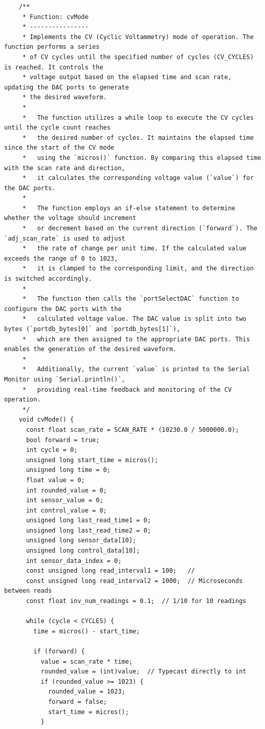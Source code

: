 \documentclass{article}
\begin{document}
\begin{lstlisting}
    /**
     * Function: cvMode
     * ----------------
     * Implements the CV (Cyclic Voltammetry) mode of operation. The function performs a series
     * of CV cycles until the specified number of cycles (CV_CYCLES) is reached. It controls the
     * voltage output based on the elapsed time and scan rate, updating the DAC ports to generate
     * the desired waveform.
     *
     *   The function utilizes a while loop to execute the CV cycles until the cycle count reaches
     *   the desired number of cycles. It maintains the elapsed time since the start of the CV mode
     *   using the `micros()` function. By comparing this elapsed time with the scan rate and direction,
     *   it calculates the corresponding voltage value (`value`) for the DAC ports.
     *
     *   The function employs an if-else statement to determine whether the voltage should increment
     *   or decrement based on the current direction (`forward`). The `adj_scan_rate` is used to adjust
     *   the rate of change per unit time. If the calculated value exceeds the range of 0 to 1023,
     *   it is clamped to the corresponding limit, and the direction is switched accordingly.
     *
     *   The function then calls the `portSelectDAC` function to configure the DAC ports with the
     *   calculated voltage value. The DAC value is split into two bytes (`portdb_bytes[0]` and `portdb_bytes[1]`),
     *   which are then assigned to the appropriate DAC ports. This enables the generation of the desired waveform.
     *
     *   Additionally, the current `value` is printed to the Serial Monitor using `Serial.println()`,
     *   providing real-time feedback and monitoring of the CV operation.
     */
    void cvMode() {
      const float scan_rate = SCAN_RATE * (10230.0 / 5000000.0);
      bool forward = true;
      int cycle = 0;
      unsigned long start_time = micros();
      unsigned long time = 0;
      float value = 0;
      int rounded_value = 0;
      int sensor_value = 0;
      int control_value = 0;
      unsigned long last_read_time1 = 0;
      unsigned long last_read_time2 = 0;
      unsigned long sensor_data[10];
      unsigned long control_data[10];
      int sensor_data_index = 0;
      const unsigned long read_interval1 = 100;   // 
      const unsigned long read_interval2 = 1000;  // Microseconds between reads
      const float inv_num_readings = 0.1;  // 1/10 for 10 readings
    
      while (cycle < CYCLES) {
        time = micros() - start_time;
    
        if (forward) {
          value = scan_rate * time;
          rounded_value = (int)value;  // Typecast directly to int
          if (rounded_value >= 1023) {
            rounded_value = 1023;
            forward = false;
            start_time = micros();
          }
    

\end{lstlisting}
\end{document}
